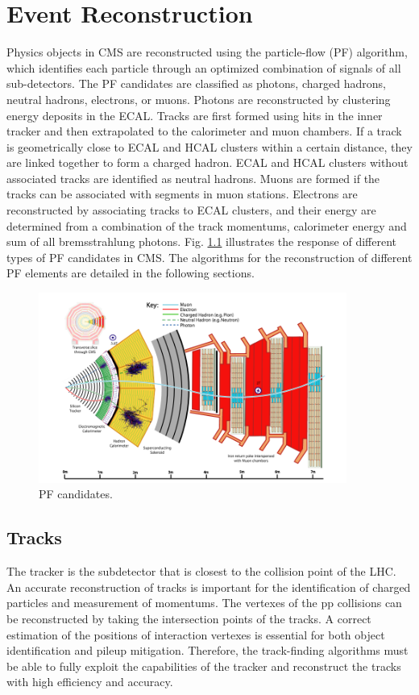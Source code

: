 \documentclass[thesis.tex]{subfiles}
\begin{document}
\chapter{Event Reconstruction}

Physics objects in CMS are reconstructed using the particle-flow (PF) algorithm, which identifies each particle through an optimized combination of signals of all sub-detectors.
The PF candidates are classified as photons, charged hadrons, neutral hadrons, electrons, or muons.
Photons are reconstructed by clustering energy deposits in the ECAL. 
Tracks are first formed using hits in the inner tracker and then extrapolated to the calorimeter and muon chambers.
If a track is geometrically close to ECAL and HCAL clusters within a certain distance, they are linked together to form a charged hadron.  
ECAL and HCAL clusters without associated tracks are identified as neutral hadrons. 
Muons are formed if the tracks can be associated with segments in muon stations. 
Electrons are reconstructed by associating tracks to ECAL clusters, and their energy are determined from a combination of the track momentums, calorimeter energy and sum of all bremsstrahlung photons. 
Fig. \ref{fig:PF} illustrates the response of different types of PF candidates in CMS. 
The algorithms for the reconstruction of different PF elements are detailed in the following sections. 

\begin{figure}[h]
	\includegraphics[width=0.9\textwidth]{plot/PF.png}
	\caption{PF candidates.}
	\label{fig:PF}
\end{figure}


\section{Tracks}
The tracker is the subdetector that is closest to the collision point of the LHC. 
An accurate reconstruction of tracks is important for the identification of charged particles and measurement of momentums. 
The vertexes of the pp collisions can be reconstructed by taking the intersection points of the tracks.
A correct estimation of the positions of interaction vertexes is essential for both object identification and pileup mitigation.
Therefore, the track-finding algorithms must be able to fully exploit the capabilities of the tracker and reconstruct the tracks with high efficiency and accuracy. 
\end{document}
